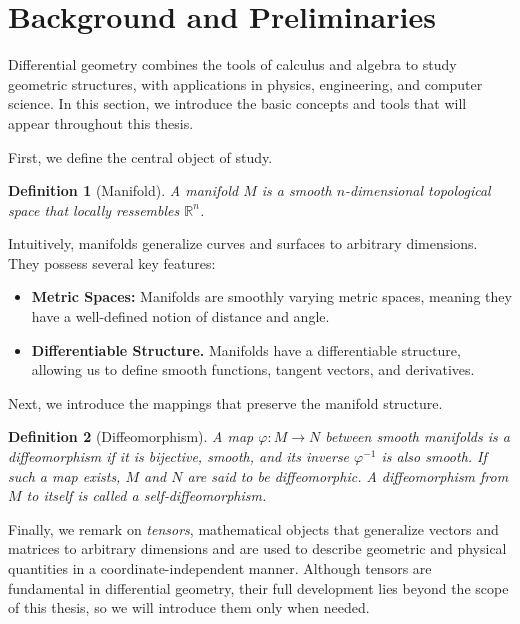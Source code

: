 \documentclass[12pt]{article}
\newtheorem{definition}{Definition}[section]
\begin{document}
\section{Background and Preliminaries}

Differential geometry combines the tools of calculus and algebra to study geometric structures, with applications in physics, engineering, and computer science. 
In this section, we introduce the basic concepts and tools that will appear throughout this thesis.

\medskip
\noindent
First, we define the central object of study.

\begin{definition}[Manifold]\label{def:manifold}
A \emph{manifold} $M$ is a smooth $n$-dimensional topological space that locally ressembles $\mathbb{R}^n$.
\end{definition}

Intuitively, manifolds generalize curves and surfaces to arbitrary dimensions. They possess several key features:
\begin{itemize}
  \item \textbf{Metric Spaces: } Manifolds are smoothly varying metric spaces, meaning they have a well-defined notion of distance and angle.
  \item \textbf{Differentiable Structure.} Manifolds have a differentiable structure, allowing us to define smooth functions, tangent vectors, and derivatives.
\end{itemize}

\medskip
\noindent
Next, we introduce the mappings that preserve the manifold structure.

\begin{definition}[Diffeomorphism]\label{def:diffeomorphism}
A map $\varphi\colon M \to N$ between smooth manifolds is a \emph{diffeomorphism} if it is bijective, smooth, and its inverse $\varphi^{-1}$ is also smooth. 
If such a map exists, $M$ and $N$ are said to be \emph{diffeomorphic}. 
A diffeomorphism from $M$ to itself is called a \emph{self‑diffeomorphism}.
\end{definition}

\medskip
\noindent
Finally, we remark on \emph{tensors}, mathematical objects that generalize vectors and matrices to arbitrary dimensions and are used to describe geometric and physical quantities in a coordinate-independent manner.
Although tensors are fundamental in differential geometry, their full development lies beyond the scope of this thesis, so we will introduce them only when needed.
\end{document}
